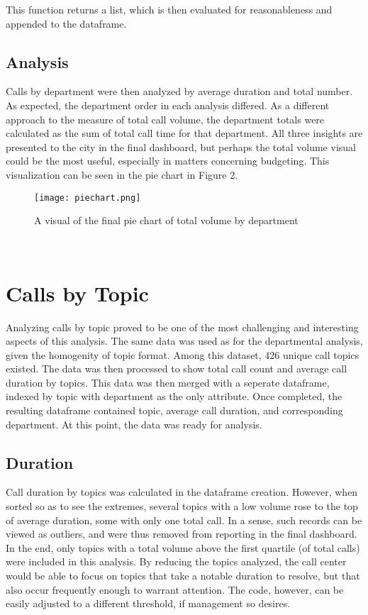 \documentclass[11pt,twocolumn]{article}
\begin{document}
This function returns a list, which is then evaluated for reasonableness and appended to the dataframe.

\subsection{Analysis}
Calls by department were then analyzed by average duration and total number.  As expected, the department order in each analysis differed.  As a different approach to the measure of total call volume, the department totals were calculated as the sum of total call time for that department.  All three insights are presented to the city in the final dashboard, but perhaps the total volume visual could be the most useful, especially in matters concerning budgeting.  This visualization can be seen in the pie chart in Figure 2.
\begin{figure}[h]
  \texttt{[image: piechart.png]}
  \caption{A visual of the final pie chart of total volume by department}
 \end{figure}
\\
 
\section{Calls by Topic}
Analyzing calls by topic proved to be one of the most challenging and interesting aspects of this analysis.  The same data was used as for the departmental analysis, given the homogenity of topic format.  Among this dataset, 426 unique call topics existed.  The data was then processed to show total call count and average call duration by topics.  This data was then merged with a seperate dataframe, indexed by topic with department as the only attribute.  Once completed, the resulting dataframe contained topic, average call duration, and corresponding department.  At this point, the data was ready for analysis.

\subsection{Duration}
Call duration by topics was calculated in the dataframe creation.  However, when sorted so as to see the extremes, several topics with a low volume rose to the top of average duration, some with only one total call.  In a sense, such records can be viewed as outliers, and were thus removed from reporting in the final dashboard.  In the end, only topics with a total volume above the first quartile (of total calls) were included in this analysis.  By reducing the topics analyzed, the call center would be able to focus on topics that take a notable duration to resolve, but that also occur frequently enough to warrant attention.  The code, however, can be easily adjusted to a different threshold, if management so desires.
\end{document}

